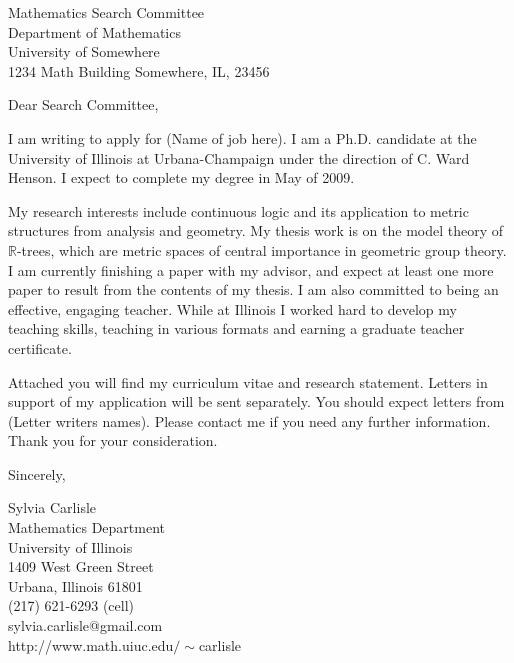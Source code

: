 \documentclass{letter}
\newcommand {\R}{\mathbb{R}}
\begin{document}
\begin{letter}{Mathematics Search Committee\\
Department of Mathematics\\
University of Somewhere\\
1234 Math Building
Somewhere, IL, 23456}


\opening{Dear Search Committee,}
I am writing to apply for (Name of job here).
I am a Ph.D. candidate at the University of Illinois at Urbana-Champaign under
the direction of C. Ward Henson. I expect to complete my degree in May of 2009.

My research interests include continuous logic
and its application to metric structures from analysis and geometry.
My thesis work is on the model theory of $\R$-trees, which are
metric spaces of central importance in geometric group theory.
I am currently finishing a paper
with my advisor, and
expect at least one more paper to result from the contents of my thesis.
I am also committed to being an effective, engaging teacher.
While at Illinois I worked hard to
develop my teaching skills, teaching in various formats and earning
a graduate teacher certificate.

Attached you will find my curriculum vitae and research statement.
Letters in support of my application will be sent separately. You should expect
letters from (Letter writers names). Please contact
me if you need any further information.
Thank you for your consideration.


\closing{Sincerely,
}

Sylvia Carlisle\\
Mathematics Department\\
University of Illinois\\
1409 West Green Street\\
Urbana, Illinois 61801\\
(217) 621-6293 (cell)\\sylvia.carlisle@gmail.com\\
http://www.math.uiuc.edu$/\sim$carlisle
\end{letter}
\end{document}
